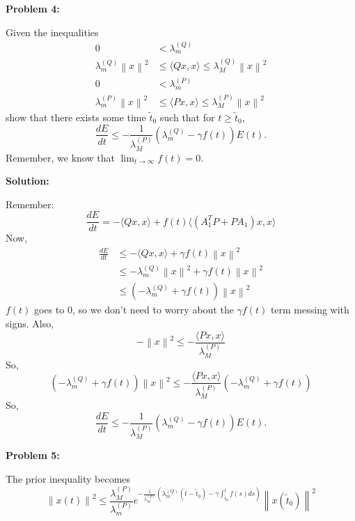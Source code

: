 \documentclass[12pt]{article}
\newcommand{\norm}[1]{\left\lVert #1 \right\rVert}
\newenvironment{problem}[1]{
    \textbf{Problem #1:}
}{
    \rmfamily \vspace{1em}
}
\newenvironment{solution}{
    \textbf{Solution:}
    
}{
    
    \vspace{2em}
}
\begin{document}
\newpage

\begin{problem}{4}
Given the inequalities
\[
    \begin{aligned}
        0 &< \lambda^{(Q)}_m \\
        \lambda^{(Q)}_m \norm{x}^2 &\leq \langle Qx, x \rangle \leq \lambda^{(Q)}_M \norm{x}^2 \\
        0 &< \lambda^{(P)}_m \\
        \lambda^{(P)}_m \norm{x}^2 &\leq \langle Px, x \rangle \leq \lambda^{(P)}_M \norm{x}^2
    \end{aligned}
\]
show that there exists some time \(\tilde{t}_0\) such that for \(t \geq \tilde{t}_0\),
\[
    \frac{dE}{dt} \leq -\frac{1}{\lambda^{(P)}_M}\left(\lambda^{(Q)}_m - \gamma f(t)\right)E(t).
\]
Remember, we know that \(\lim_{t \to \infty} f(t) = 0\).
\end{problem}

\begin{solution}
    Remember:
    \[
        \frac{dE}{dt} = -\langle Qx, x \rangle + f(t)\langle (A_1^T P + PA_1)x, x \rangle
    \]
    Now,
    \[
        \begin{aligned}
            \frac{dE}{dt} &\leq -\langle Qx, x \rangle + \gamma f(t) \norm{x}^2 \\
            & \leq -\lambda^{(Q)}_m \norm{x}^2 + \gamma f(t) \norm{x}^2 \\
            & \leq \left(-\lambda^{(Q)}_m + \gamma f(t)\right) \norm{x}^2
        \end{aligned}
    \]
    \(f(t)\) goes to \(0\), so we don't need to worry about the \(\gamma f(t)\) term messing with signs.
    Also,
    \[
        -\norm{x}^2 \leq -\frac{\langle Px, x \rangle}{\lambda^{(P)}_M}
    \]
    So,
    \[
        \left(-\lambda^{(Q)}_m + \gamma f(t)\right) \norm{x}^2 \leq -\frac{\langle Px, x \rangle}{\lambda^{(P)}_M} \left(-\lambda^{(Q)}_m + \gamma f(t)\right)
    \]
    So,
    \[
        \frac{dE}{dt} \leq -\frac{1}{\lambda^{(P)}_M}\left(\lambda^{(Q)}_m - \gamma f(t)\right)E(t).
    \]
\end{solution}

\newpage

\begin{problem}{5}
The prior inequality becomes
\[
    \norm{x(t)}^2 \leq \frac{\lambda^{(P)}_M}{\lambda^{(P)}_m} e^{-\frac{1}{\lambda^{(P)}_M}\left(\lambda^{(Q)}_m(t-\tilde{t}_0) - \gamma\int_{\tilde{t}_0}^t f(s)ds\right)} \norm{x(\tilde{t}_0)}^2
\]
\end{problem}
\end{document}
